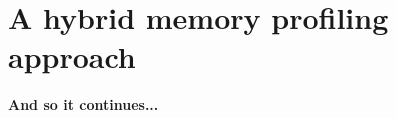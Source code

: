 \chapter{A hybrid memory profiling approach}
\label{chapter:hybrid}

\textbf{And so it continues...}\\
